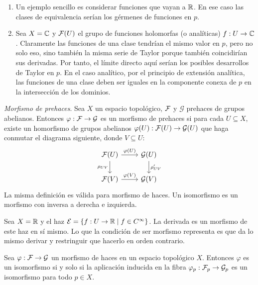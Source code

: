 \documentclass[GA.tex]{subfiles}
\begin{document}
\begin{ejs}
\begin{enumerate}
\item Un ejemplo sencillo es considerar funciones que vayan a $\mathbb{R}$. En ese caso las clases de equivalencia serían los gérmenes de funciones en $p$. 

\item Sea $X=\mathbb{C}$ y $\mathcal{F}(U)$ el grupo de funciones holomorfas (o analíticas) $f:U\to\mathbb{C}$. Claramente las funciones de una clase tendrían el mismo valor en $p$, pero no solo eso, sino también la misma serie de Taylor porque también coincidirían sus derivadas. Por tanto, el límite directo aquí serían los posibles desarrollos de Taylor en $p$. En el caso analítico, por el principio de extensión analítica, las funciones de una clase deben ser iguales en la componente conexa de $p$ en la intersección de los dominios. 
\end{enumerate}
\end{ejs}


\begin{defi}
\emph{Morfismo de prehaces}. Sea $X$ un espacio topológico, $\mathcal{F}$ y $\mathcal{G}$ prehaces de grupos abelianos. Entonces $\varphi:\mathcal{F}\to\mathcal{G}$ es un morfismo de prehaces si para cada $U\subseteq X$, existe un homorfismo de grupos abelianos $\varphi(U):\mathcal{F}(U)\to\mathcal{G}(U)$ que haga conmutar el diagrama siguiente, donde $V\subseteq U$:
\[
\begin{tikzcd}
\calF(U)\arrow[r, "\varphi(U)"]\arrow[d, "\rho_{UV}"'] & \calG(U)\arrow[d, "\rho'_{UV}"]\\
\calF(V)\arrow[r, "\varphi(V)"] & \calG(V)
\end{tikzcd}
\]
La misma definición es válida para morfismo de haces. Un isomorfismo es un morfismo con inversa a derecha e izquierda. 
\end{defi}

\begin{ej}
Sea $X=\mathbb{R}$ y el haz $\mathcal{E}=\{f:U\to \mathbb{R}\mid f\in C^{\infty}\}$. La derivada es un morfismo de este haz en sí mismo. Lo que la condición de ser morfismo representa es que da lo mismo derivar y restringuir que hacerlo en orden contrario.
\end{ej}


\begin{prop}
Sea $\varphi:\mathcal{F}\to\mathcal{G}$ un morfismo de haces en un espacio topológico $X$. Entonces $\varphi$ es un isomorfismo si y solo si la aplicación inducida en la fibra $\varphi_p:\mathcal{F}_p\to\mathcal{G}_p$ es un isomorfismo para todo $p\in X$.
\end{prop}
\end{document}
